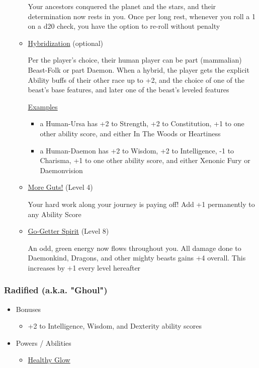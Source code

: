\documentclass[12pt, landscape]{article}
\begin{document}
\begin{FlushLeft}
\begin{multicols}{2}
\begin{itemize}
\begin{itemize}
					Your ancestors conquered the planet and the stars, and their determination now rests in you. Once per long rest, whenever you roll a 1 on a d20 check, you have the option to re-roll without penalty

					\item \underline{Hybridization} (optional)

					Per the player’s choice, their human player can be part (mammalian) Beast-Folk or part Daemon. When a hybrid, the player gets the explicit Ability buffs of their other race up to +2, and the choice of one of the beast’s base features, and later one of the beast’s leveled features

					\underline{Examples}
					\begin{itemize}
						\item a Human-Ursa has +2 to Strength, +2 to Constitution, +1 to one other ability score, and either In The Woods or Heartiness
						\item a Human-Daemon has +2 to Wisdom, +2 to Intelligence, -1 to Charisma, +1 to one other ability score, and either Xenonic Fury or Daemonvision
					\end{itemize}

					\item \underline{More Guts!} (Level 4)

					Your hard work along your journey is paying off! Add +1 permanently to any Ability Score

					\item \underline{Go-Getter Spirit} (Level 8)

					An odd, green energy now flows throughout you. All damage done to Daemonkind, Dragons, and other mighty beasts gains +4 overall. This increases by +1 every level hereafter
				\end{itemize}
			\end{itemize}
			\columnbreak

			\subsubsection{Radified (a.k.a. "Ghoul")}
			\begin{itemize}
				\item Bonuses
				\begin{itemize}
					\item +2 to Intelligence, Wisdom, and Dexterity ability scores
				\end{itemize}
				\item Powers / Abilities
				\begin{itemize}
					\item \underline{Healthy Glow}


\end{itemize}
\end{itemize}
\end{multicols}
\end{FlushLeft}
\end{document}
